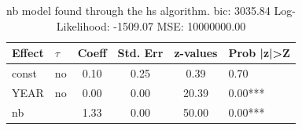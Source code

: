 \begin{table}
	\caption{nb model found through the hs algorithm. bic: 3035.84 Log-Likelihood: -1509.07 MSE: 10000000.00}
	\begin{center}
		\begin{tabular}{|l|l|c|c|c|l|}
			\hline
			Effect & $\tau$ & Coeff & Std. Err & z-values & Prob |z|>Z \\
			\hline
			const & no & 0.10 & 0.25 & 0.39 & 0.70 \\
			\hline
			YEAR & no & 0.00 & 0.00 & 20.39 & 0.00*** \\
			\hline
			nb &  & 1.33 & 0.00 & 50.00 & 0.00*** \\
			\hline
		\end{tabular}
	\end{center}
\end{table}
